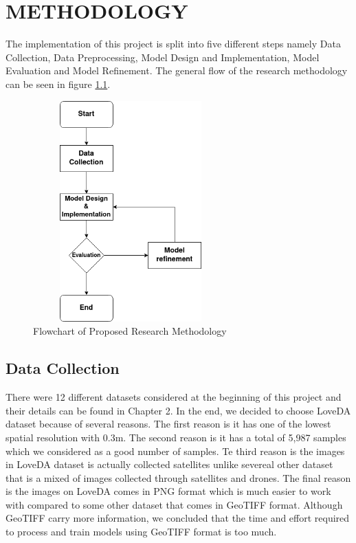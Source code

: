 \chapter{METHODOLOGY}

The implementation of this project is split into five different steps namely Data Collection, Data Preprocessing, Model Design and Implementation, Model Evaluation and Model Refinement. The general flow of the research methodology can be seen in figure \ref{fig:flowchart1}.

\FloatBarrier
\begin{figure}[!h]
\includegraphics[width=7.5cm, height=8.5cm]{images/flowchart1.png}
\centering
\caption{Flowchart of Proposed Research Methodology}
\label{fig:flowchart1}
\end{figure}


\section{Data Collection}

There were 12 different datasets considered at the beginning of this project and their details can be found in Chapter 2. In the end, we decided to choose LoveDA dataset \cite{loveda} because of several reasons. The first reason is it has one of the lowest spatial resolution with 0.3m. The second reason is it has a total of 5,987 samples which we considered as a good number of samples. Te third reason is the images in LoveDA dataset is actually collected satellites unlike severeal other dataset that is a mixed of images collected through satellites and drones. The final reason is the images on LoveDA comes in PNG format which is much easier to work with compared to some other dataset that comes in GeoTIFF format. Although GeoTIFF carry more information, we concluded that the time and effort required to process and train models using GeoTIFF format is too much.

